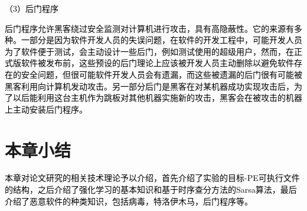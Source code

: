 \textcolor{black}{（3）后门程序}

\textcolor{black}{后门程序允许黑客绕过安全监测对计算机进行攻击，具有高隐蔽性。它的来源有多种。一部分是因为软件开发人员的失误问题，在软件的开发工程中，可能开发人员为了软件便于测试，会主动设计一些后门，例如测试使用的超级用户，然而，在正式版软件被发布前，这些预设的后门理论上应该被开发人员主动删除以避免软件存在的安全问题，但很可能软件开发人员会有遗漏，而这些被遗漏的后门很有可能被黑客利用向计算机发动攻击。另一部分后门是黑客在对某机器成功实现攻击后，为了以后能利用这台主机作为跳板对其他机器实施新的攻击，黑客会在被攻击的机器上主动安装后门程序。}

\section{本章小结}

\textcolor{black}{本章对论文研究的相关技术理论予以介绍，首先介绍了实验的目标-PE可执行文件的结构，之后介绍了强化学习的基本知识和基于时序查分方法的Sarsa算法，最后介绍了恶意软件的种类知识，包括病毒，特洛伊木马，后门程序等。}